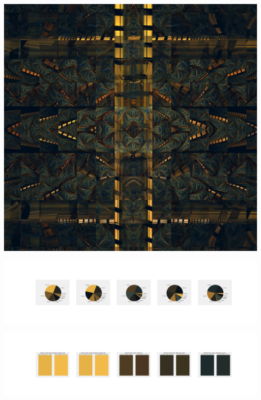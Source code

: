 \documentclass[11pt]{article}
\begin{document}
\begin{landscape}
    \begin{center}
    \includegraphics[width=\textwidth]{./nbimg/file (256).jpg}
    \end{center}

    \begin{center}
    \includegraphics[width=250mm]{./nbimg/pie-174.jpg}
    \end{center}

    \begin{center}
    \includegraphics[width=250mm]{./nbimg/peak-174.jpg}
    \end{center}
    


\end{landscape}
\end{document}
